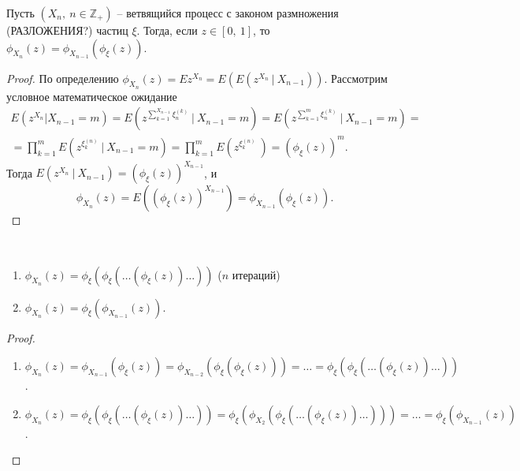 \begin{proposition}
Пусть $\displaystyle ( X_{n} ,\ n\in \mathbb{Z}_{+})$ -- ветвящийся процесс с законом размножения (РАЗЛОЖЕНИЯ?) частиц $\displaystyle \xi $. Тогда, если $\displaystyle z\in [ 0,\ 1]$, то $\displaystyle \phi _{X_{n}}( z) =\phi _{X_{n-1}}( \phi _{\xi }( z))$.
\end{proposition}
\begin{proof}
По определению $\displaystyle \phi _{X_{n}}( z) =Ez^{X_{n}} =E\left( E\left( z^{X_{n}} \ |\ X_{n-1}\right)\right)$. Рассмотрим условное математическое ожидание
\begin{gather*}
E\left( z^{X_{n}} |X_{n-1} =m\right) =E\left( z^{\sum _{k=1}^{X_{n-1}} \xi _{n}^{( k)}} \ |\ X_{n-1} =m\right) =E\left( z^{\sum _{k=1}^{m} \xi _{n}^{( k)}} \ |\ X_{n-1} =m\right) =\\
=\prod _{k=1}^{m} E\left( z^{\xi _{k}^{( n)}} \ |\ X_{n-1} =m\right) =\prod _{k=1}^{m} E\left( z^{\xi _{k}^{( n)}} \ \right) =( \phi _{\xi }( z))^{m} .
\end{gather*}
Тогда $\displaystyle E\left( z^{X_{n}} \ |\ X_{n-1}\right) =( \phi _{\xi }( z))^{X_{n-1}}$, и
\begin{equation*}
\phi _{X_{n}}( z) =E\left(( \phi _{\xi }( z))^{X_{n-1}}\right) =\phi _{X_{n-1}}( \phi _{\xi }( z)) .
\end{equation*}
\end{proof}
\begin{corollary} ~
\begin{enumerate}
    \item $\displaystyle \phi _{X_{n}}( z) =\phi _{\xi }( \phi _{\xi }( \dotsc ( \phi _{\xi }( z)) \dotsc ))$ ($\displaystyle n$ итераций)
    \item $\displaystyle \phi _{X_{n}}( z) =\phi _{\xi }( \phi _{X_{n-1}}( z))$.
\end{enumerate}
\end{corollary}
\begin{proof} ~
\begin{enumerate}
    \item $\displaystyle \phi _{X_{n}}( z) =\phi _{X_{n-1}}( \phi _{\xi }( z)) =\phi _{X_{n-2}}( \phi _{\xi }( \phi _{\xi }( z))) =\dotsc =\phi _{\xi }( \phi _{\xi }( \dotsc ( \phi _{\xi }( z)) \dotsc ))$.
    \item $\displaystyle \phi _{X_{n}}( z) =\phi _{\xi }( \phi _{\xi }( \dotsc ( \phi _{\xi }( z)) \dotsc )) =\phi _{\xi }( \phi _{X_{2}}( \phi _{\xi }( \dotsc ( \phi _{\xi }( z)) \dotsc ))) =\dotsc =\phi _{\xi }( \phi _{X_{n-1}}( z))$.
\end{enumerate}
\end{proof}
